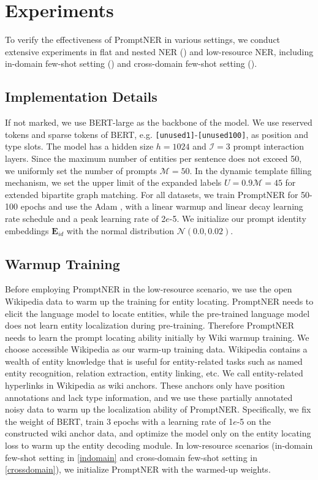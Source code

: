 \documentclass[11pt]{article}
\begin{document}
\section{Experiments}

To verify the effectiveness of PromptNER in various settings, we conduct extensive experiments in flat and nested NER () and low-resource NER, including in-domain few-shot setting () and cross-domain few-shot setting ().

\subsection{Implementation Details} If not marked, we use BERT-large \citep{devlin-etal-2019-bert} as the backbone of the model. We use reserved tokens and sparse tokens of BERT, e.g. \texttt{[unused1]}-\texttt{[unused100]}, as position and type slots. 
The model has a hidden size $h = 1024$ and $\mathcal{I}=3$ prompt interaction layers. 
Since the maximum number of entities per sentence does not exceed 50, we uniformly set the number of prompts $\mathcal{M} = 50$. In the dynamic template filling mechanism, we set the upper limit of the expanded labels $U=0.9\mathcal{M}=45$ for extended bipartite graph matching. For all datasets, we train PromptNER for 50-100 epochs and use the Adam \citep{adam}, with a linear warmup and linear decay learning rate schedule and a peak learning rate of 2$e$-5. We initialize our prompt identity embeddings $\mathbf{E}_{id}$ with the normal distribution $\mathcal{N}(0.0,0.02)$. 


\subsection{Warmup Training}


Before employing PromptNER in the low-resource scenario, we use the open Wikipedia data to warm up the training for entity locating. PromptNER needs to elicit the language model to locate entities, while the pre-trained language model does not learn entity localization during pre-training. Therefore PromptNER needs to learn the prompt locating ability initially by Wiki warmup training. We choose accessible Wikipedia as our warm-up training data. Wikipedia contains a wealth of entity knowledge \citep{yamada-etal-2020-luke, wang2022damonlp} that is useful for entity-related tasks such as named entity recognition, relation extraction, entity linking, etc. 
We call entity-related hyperlinks in Wikipedia as wiki anchors.
These anchors only have position annotations and lack type information, and we use these partially annotated noisy data to warm up the localization ability of PromptNER. Specifically, we fix the weight of BERT, train 3 epochs with a learning rate of 1$e$-5 on the constructed wiki anchor data, and optimize the model only on the entity locating loss to warm up the entity decoding module. In low-resource scenarios (in-domain few-shot setting in \cref{indomain} and cross-domain few-shot setting in \cref{crossdomain}), we initialize PromptNER with the warmed-up weights.
\end{document}
